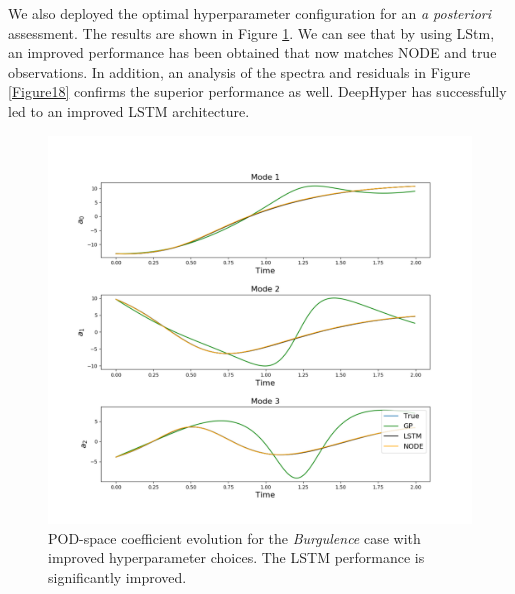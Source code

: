 \documentclass[preprint,12pt]{elsarticle}
\begin{document}
We also deployed the optimal hyperparameter configuration for an \emph{a posteriori} assessment. The results are shown in Figure \ref{Figure17}. We can see that by using LStm, an improved performance has been obtained that now matches NODE and true observations. In addition, an analysis of the spectra and residuals in Figure \ref{Figure18} confirms the superior performance as well. DeepHyper has successfully led to an improved LSTM architecture.


\begin{figure}
	\centering
	\includegraphics[width=\textwidth]{Figure_22.pdf}
	\caption{POD-space coefficient evolution for the \emph{Burgulence} case with improved hyperparameter choices. The LSTM performance is significantly improved.}
	\label{Figure17}
\end{figure}
\end{document}
